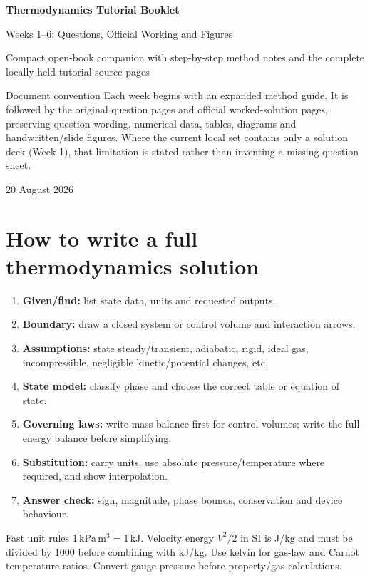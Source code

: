 \documentclass[9pt,a4paper]{extarticle}
\begin{document}
\begin{titlepage}\centering\vspace*{27mm}
{\Huge\bfseries Thermodynamics Tutorial Booklet\par}\vspace{4mm}
{\Large Weeks 1--6: Questions, Official Working and Figures\par}\vspace{12mm}
{\large Compact open-book companion with step-by-step method notes and the complete locally held tutorial source pages\par}
\vfill
\begin{method}{Document convention}
Each week begins with an expanded method guide. It is followed by the original question pages and official worked-solution pages, preserving question wording, numerical data, tables, diagrams and handwritten/slide figures. Where the current local set contains only a solution deck (Week 1), that limitation is stated rather than inventing a missing question sheet.
\end{method}
\vfill 20 August 2026
\end{titlepage}
\tableofcontents\newpage

\section{How to write a full thermodynamics solution}
\begin{enumerate}
\item \textbf{Given/find:} list state data, units and requested outputs.
\item \textbf{Boundary:} draw a closed system or control volume and interaction arrows.
\item \textbf{Assumptions:} state steady/transient, adiabatic, rigid, ideal gas, incompressible, negligible kinetic/potential changes, etc.
\item \textbf{State model:} classify phase and choose the correct table or equation of state.
\item \textbf{Governing laws:} write mass balance first for control volumes; write the full energy balance before simplifying.
\item \textbf{Substitution:} carry units, use absolute pressure/temperature where required, and show interpolation.
\item \textbf{Answer check:} sign, magnitude, phase bounds, conservation and device behaviour.
\end{enumerate}
\begin{method}{Fast unit rules}
$1\,\mathrm{kPa\,m^3}=1\,\mathrm{kJ}$. Velocity energy $V^2/2$ in SI is J/kg and must be divided by 1000 before combining with kJ/kg. Use kelvin for gas-law and Carnot temperature ratios. Convert gauge pressure before property/gas calculations.
\end{method}
\end{document}
